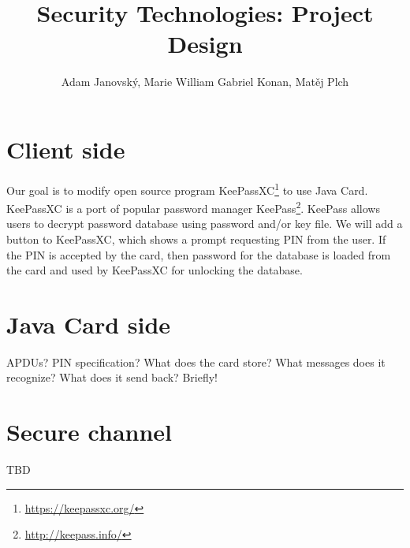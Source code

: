 \documentclass[12pt,a4paper]{article}
\title{Security Technologies: Project Design}
\author{Adam Janovský, Marie William Gabriel Konan, Matěj Plch}
\date{}
\begin{document}
\maketitle

\section{Client side}
Our goal is to modify open source program KeePassXC\footnote{\url{https://keepassxc.org/}} to use Java Card. KeePassXC is a port of popular password manager KeePass\footnote{\url{http://keepass.info/}}. KeePass allows users to decrypt password database using password and/or key file. We will add a button to KeePassXC, which shows a prompt requesting PIN from the user. If the PIN is accepted by the card, then password for the database is loaded from the card and used by KeePassXC for unlocking the database.

\section{Java Card side}
APDUs? PIN specification? What does the card store? What messages does it recognize? What does it send back? Briefly!

\section{Secure channel}
TBD
\end{document}
